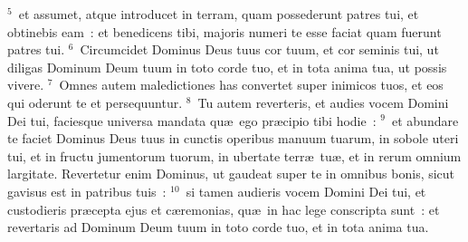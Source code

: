 ${}^{5}$~et assumet, atque introducet in terram, quam possederunt patres tui, et obtinebis eam~: et benedicens tibi, majoris numeri te esse faciat quam fuerunt patres tui.
${}^{6}$~Circumcidet Dominus Deus tuus cor tuum, et cor seminis tui, ut diligas Dominum Deum tuum in toto corde tuo, et in tota anima tua, ut possis vivere.
${}^{7}$~Omnes autem maledictiones has convertet super inimicos tuos, et eos qui oderunt te et persequuntur.
${}^{8}$~Tu autem reverteris, et audies vocem Domini Dei tui, faciesque universa mandata qu\ae\ ego pr\ae cipio tibi hodie~:
${}^{9}$~et abundare te faciet Dominus Deus tuus in cunctis operibus manuum tuarum, in sobole uteri tui, et in fructu jumentorum tuorum, in ubertate terr\ae\ tu\ae , et in rerum omnium largitate. Revertetur enim Dominus, ut gaudeat super te in omnibus bonis, sicut gavisus est in patribus tuis~:
${}^{10}$~si tamen audieris vocem Domini Dei tui, et custodieris pr\ae cepta ejus et c\ae remonias, qu\ae\ in hac lege conscripta sunt~: et revertaris ad Dominum Deum tuum in toto corde tuo, et in tota anima tua.


